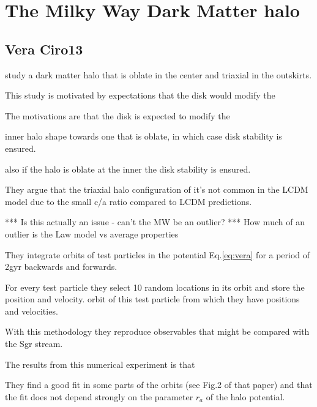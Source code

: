 

\section{The Milky Way Dark Matter halo}\label{mw}
\subsection{Vera Ciro13}

\citep{Vera13} study a dark matter halo that is oblate in the center
 and triaxial in the outskirts. 

This study is motivated by expectations that the disk would modify the 

The motivations are that the disk is expected
 to modify the

 inner halo shape towards one that is oblate, in which case disk stability 
is ensured.  

also if the
halo is oblate at the inner the disk stability is ensured. 

They
argue that the triaxial halo configuration of \citep{Law10} it's
not common in the LCDM model due to the small c/a ratio compared to
LCDM predictions.

*** Is this actually an issue - can’t the MW be an outlier?   
***  How much of an outlier is the Law model vs average properties


They integrate orbits of test particles in the potential Eq.\ref{eq:vera} for a period
of 2gyr backwards and forwards. 

For every test particle they select 10 random locations 
in its orbit and store the position and velocity. 
orbit of this test particle from which they have positions and velocities.

 With this methodology they reproduce observables that might be compared with 
the Sgr stream.

The results from this numerical experiment is that 

They find  a good fit in some
parts of the orbits (see Fig.2 of that paper) and that the fit does not depend
strongly on the parameter $r_a$ of the halo potential.

